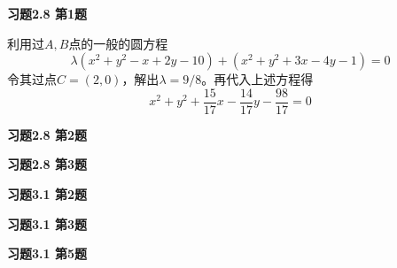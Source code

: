 \renewcommand{\newpageorvspace}{\vspace{2em}}

\date{第六次作业}



\maketitle

{\bf 习题2.8 第1题}

利用过$A,B$点的一般的圆方程
$$\lambda (x^2+y^2-x+2y-10) + (x^2+y^2+3x-4y-1) = 0$$
令其过点$C = (2,0)$，解出$\lambda = 9/8$。再代入上述方程得
$$x^2+y^2+\dfrac{15}{17}x-\dfrac{14}{17}y-\dfrac{98}{17}=0$$

\newpageorvspace

{\bf 习题2.8 第2题}

\newpageorvspace

{\bf 习题2.8 第3题}

\newpageorvspace

{\bf 习题3.1 第2题}

\newpageorvspace

{\bf 习题3.1 第3题}

\newpageorvspace

{\bf 习题3.1 第5题}

\newpageorvspace



